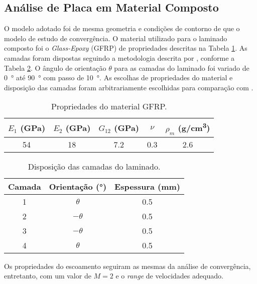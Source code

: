 \subsection{Análise de Placa em Material Composto}

O modelo adotado foi de mesma geometria e condições de contorno de que o modelo de estudo de convergência. O material utilizado para o laminado composto foi o \emph{Glass-Epoxy} (GFRP) de propriedades descritas na Tabela \ref{tab-cfrp}. As camadas foram dispostas seguindo a metodologia descrita por \cite{}, conforme a Tabela \ref{tab-camadas}. O ângulo de orientação $\theta$ para as camadas do laminado foi variado de \SI{0}{\degree} até \SI{90}{\degree} com passo de \SI{10}{\degree}. As escolhas de propriedades do material e disposição das camadas foram arbitrariamente escolhidas para comparação com \cite{sawyer_flutter_1977}.

\begin{table}[H]
\centering
\caption{Propriedades do material GFRP.}
\begin{tabular}{|c|c|c|c|c|}
\hline
$E_1$ (\si{GPa}) & $E_2$ (\si{GPa}) & $G_{12}$ (\si{GPa}) & $\nu$ & $\rho_m$ (\si{g/cm^3}) \\ \hline
\num{54} & \num{18} & \num{7.2} & \num{0.3} & \num{2.6} \\ \hline
\end{tabular}
\label{tab-cfrp}
\end{table}

\begin{table}[H]
\centering
\caption{Disposição das camadas do laminado.}
\begin{tabular}{|c|c|c|}
\hline
Camada & Orientação (\si{\degree}) & Espessura (\si{mm}) \\ \hline
1      & $\theta$   & \num{0.5}   \\ \hline
2      & $-\theta$  & \num{0.5}   \\ \hline
3      & $-\theta$  & \num{0.5}   \\ \hline
4      & $\theta$   & \num{0.5}   \\ \hline
\end{tabular}
\label{tab-camadas}
\end{table}

Os propriedades do escoamento seguiram as mesmas da análise de 
convergência, entretanto, com um valor de $M = \num{2}$ e o 
\emph{range} de velocidades adequado.

